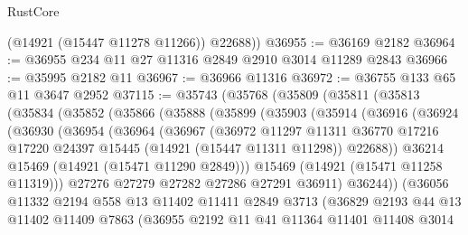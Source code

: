 \begin{lexlean}{RustCore}
\begin{coremodule}
        (@14921 (@15447 @11278 @11266))
        @22688))
@36955 := @36169 @2182
@36964 := @36955 @234 @11 @27 @11316 @2849 @2910 @3014 @11289 @2843
@36966 := @35995 @2182 @11
@36967 := @36966 @11316
@36972 := @36755 @133 @65 @11 @3647 @2952
@37115 := @35743
    (@35768
      (@35809
        (@35811
          (@35813
            (@35834
              (@35852
                (@35866
                  (@35888
                    (@35899
                      (@35903
                        (@35914
                          (@36916
                            (@36924
                              (@36930
                                (@36954
                                  (@36964
                                    (@36967
                                      (@36972
                                        @11297
                                        @11311
                                        @36770
                                        @17216
                                        @17220
                                        @24397
                                        @15445
                                        (@14921 (@15447 @11311 @11298))
                                        @22688))
                                    @36214
                                    @15469
                                    (@14921 (@15471 @11290 @2849)))
                                  @15469
                                  (@14921 (@15471 @11258 @11319)))
                                @27276
                                @27279
                                @27282
                                @27286
                                @27291
                                @36911)
                              @36244))
                          (@36056
                            @11332
                            @2194
                            @558
                            @13
                            @11402
                            @11411
                            @2849
                            @3713
                            (@36829
                              @2193
                              @44
                              @13
                              @11402
                              @11409
                              @7863
                              (@36955
                                @2192
                                @11
                                @41
                                @11364
                                @11401
                                @11408
                                @3014

\end{coremodule}
\end{lexlean}
